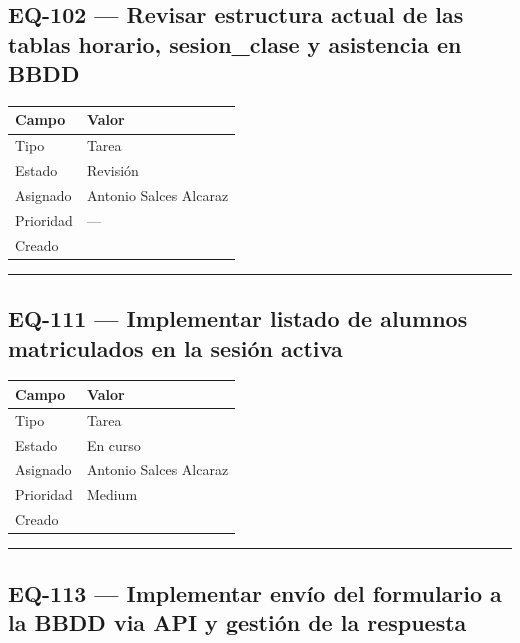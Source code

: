 \documentclass[
  spanish,
  11pt,
]{report}
\newcounter{none} %
\begin{document}
\subsection{EQ-102 --- Revisar estructura actual de las tablas horario,
sesion\_clase y asistencia en
BBDD}\label{eq-102-revisar-estructura-actual-de-las-tablas-horario-sesion_clase-y-asistencia-en-bbdd}

{\def\LTcaptype{none} %
\begin{longtable}[]{@{}ll@{}}
\toprule\noalign{}
Campo & Valor \\
\midrule\noalign{}
\endhead
\bottomrule\noalign{}
\endlastfoot
Tipo & Tarea \\
Estado & Revisión \\
Asignado & Antonio Salces Alcaraz \\
Prioridad & --- \\
Creado & \\
\end{longtable}
}

\begin{center}\rule{0.5\linewidth}{0.5pt}\end{center}

\subsection{EQ-111 --- Implementar listado de alumnos matriculados en la
sesión
activa}\label{eq-111-implementar-listado-de-alumnos-matriculados-en-la-sesiuxf3n-activa}

{\def\LTcaptype{none} %
\begin{longtable}[]{@{}ll@{}}
\toprule\noalign{}
Campo & Valor \\
\midrule\noalign{}
\endhead
\bottomrule\noalign{}
\endlastfoot
Tipo & Tarea \\
Estado & En curso \\
Asignado & Antonio Salces Alcaraz \\
Prioridad & Medium \\
Creado & \\
\end{longtable}
}

\begin{center}\rule{0.5\linewidth}{0.5pt}\end{center}

\subsection{EQ-113 --- Implementar envío del formulario a la BBDD via
API y gestión de la
respuesta}\label{eq-113-implementar-envuxedo-del-formulario-a-la-bbdd-via-api-y-gestiuxf3n-de-la-respuesta}
\end{document}

